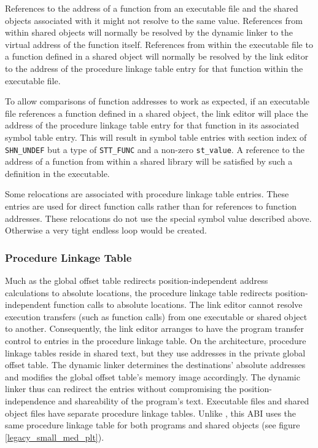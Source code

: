 References to the address of a function from an executable
file and the shared objects associated with it might not resolve to
the same value. References from within shared objects will normally be
resolved by the dynamic linker to the virtual address of the function
itself. References from within the executable file to a function
defined in a shared object will normally be resolved by the link
editor to the address of the procedure linkage table entry for that
function within the executable file.

To allow comparisons of function addresses to work as expected, if an
executable file references a function defined in a shared object, the
link editor will place the address of the procedure linkage table
entry for that function in its associated symbol table entry. This
will result in symbol table entries with section index of {\tt SHN_UNDEF}
but a type of {\tt STT_FUNC} and a non-zero {\tt st_value}.  A reference to the
address of a function from within a shared library will be satisfied
by such a definition in the executable.

Some relocations are associated with procedure linkage table
entries. These entries are used for direct function calls rather than
for references to function addresses. These relocations do not use the special
symbol value described above. Otherwise a very tight endless loop
would be created.

\subsubsection{Procedure Linkage Table}



Much as the global offset table redirects position-independent address
calculations to absolute locations, the procedure linkage table
redirects position-independent function calls to absolute locations.
The link editor cannot resolve execution transfers (such as function
calls) from one executable or shared object to another.  Consequently,
the link editor arranges to have the program transfer control to
entries in the procedure linkage table.  On the \xARCH architecture,
procedure linkage tables reside in shared text, but they use addresses
in the private global offset table.  The dynamic linker determines the
destinations' absolute addresses and modifies the global offset
table's memory image accordingly.  The dynamic linker thus can
redirect the entries without compromising the position-independence
and shareability of the program's text.  Executable files and shared
object files have separate procedure linkage tables.  Unlike
\intelabi, this ABI uses the same procedure linkage table for both
programs and shared objects (see figure \ref{legacy_small_med_plt}).

